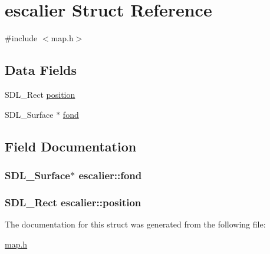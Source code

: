 \hypertarget{structescalier}{}\section{escalier Struct Reference}
\label{structescalier}


{\ttfamily \#include $<$map.\+h$>$}

\subsection*{Data Fields}
\begin{DoxyCompactItemize}
\item 
S\+D\+L\+\_\+\+Rect \hyperlink{structescalier_afe001a66e03ef6806fcd2e76e13fad4d}{position}
\item 
S\+D\+L\+\_\+\+Surface $\ast$ \hyperlink{structescalier_ab9698d9dc51214bcb04f4ba82d1059b3}{fond}
\end{DoxyCompactItemize}


\subsection{Field Documentation}
\subsubsection[{\texorpdfstring{fond}{fond}}]{\setlength{\rightskip}{0pt plus 5cm}S\+D\+L\+\_\+\+Surface$\ast$ escalier\+::fond}\hypertarget{structescalier_ab9698d9dc51214bcb04f4ba82d1059b3}{}\label{structescalier_ab9698d9dc51214bcb04f4ba82d1059b3}
\subsubsection[{\texorpdfstring{position}{position}}]{\setlength{\rightskip}{0pt plus 5cm}S\+D\+L\+\_\+\+Rect escalier\+::position}\hypertarget{structescalier_afe001a66e03ef6806fcd2e76e13fad4d}{}\label{structescalier_afe001a66e03ef6806fcd2e76e13fad4d}


The documentation for this struct was generated from the following file\+:\begin{DoxyCompactItemize}
\item 
\hyperlink{map_8h}{map.\+h}\end{DoxyCompactItemize}
